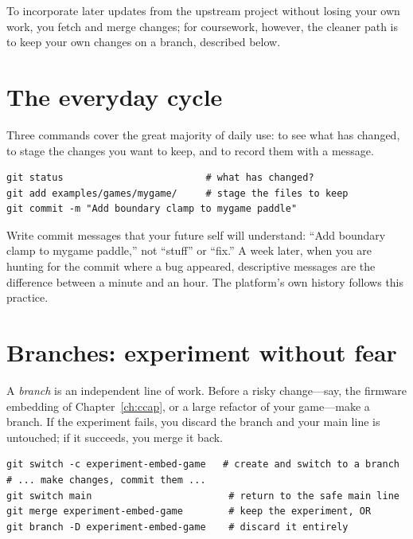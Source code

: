 To incorporate later updates from the upstream project without losing your own
work, you fetch and merge changes; for coursework, however, the cleaner path is to
keep your own changes on a branch, described below.

\section{The everyday cycle}

Three commands cover the great majority of daily use:  to see what has
changed,  to stage the changes you want to keep, and  to
record them with a message.

\begin{lstlisting}[style=bash,caption={The everyday Git cycle: inspect, stage, commit.}]
git status                         # what has changed?
git add examples/games/mygame/     # stage the files to keep
git commit -m "Add boundary clamp to mygame paddle"
\end{lstlisting}

\begin{prgwarn}
Write commit messages that your future self will understand: ``Add boundary clamp
to mygame paddle,'' not ``stuff'' or ``fix.'' A week later, when you are hunting for
the commit where a bug appeared, descriptive messages are the difference between a
minute and an hour. The platform's own history follows this practice.
\end{prgwarn}

\section{Branches: experiment without fear}

A \emph{branch} is an independent line of work. Before a risky change---say, the
firmware embedding of Chapter~\ref{ch:ccap}, or a large refactor of your game---make
a branch. If the experiment fails, you discard the branch and your main line is
untouched; if it succeeds, you merge it back.

\begin{lstlisting}[style=bash,caption={Working on a branch, then merging or discarding.}]
git switch -c experiment-embed-game   # create and switch to a branch
# ... make changes, commit them ...
git switch main                        # return to the safe main line
git merge experiment-embed-game        # keep the experiment, OR
git branch -D experiment-embed-game    # discard it entirely
\end{lstlisting}

